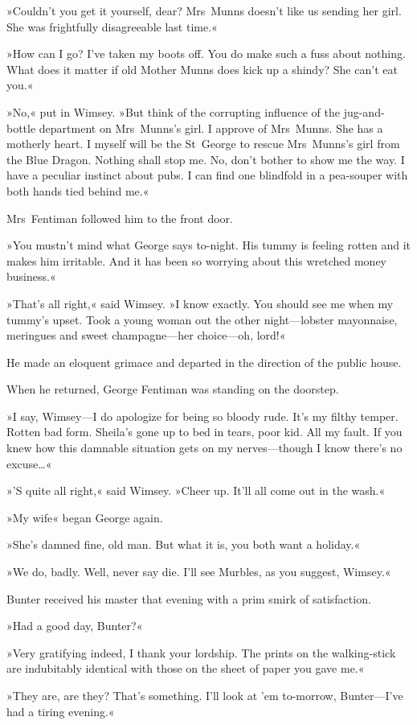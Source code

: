 »Couldn't you get it yourself, dear? Mrs~Munns doesn't like us sending her girl. She was frightfully disagreeable last time.«

»How can I go? I've taken my boots off. You do make such a fuss about nothing. What does it matter if old Mother Munns does kick up a shindy? She can't eat you.«

»No,« put in Wimsey. »But think of the corrupting influence of the jug-and-bottle department on Mrs~Munns's girl. I approve of Mrs~Munns. She has a motherly heart. I myself will be the St~George to rescue Mrs~Munns's girl from the Blue Dragon. Nothing shall stop me. No, don't bother to show me the way. I have a peculiar instinct about pubs. I can find one blindfold in a pea-souper with both hands tied behind me.«

Mrs~Fentiman followed him to the front door.

»You mustn't mind what George says to-night. His tummy is feeling rotten and it makes him irritable. And it has been so worrying about this wretched money business.«

»That's all right,« said Wimsey. »I know exactly. You should see me when my tummy's upset. Took a young woman out the other night—lobster mayonnaise, meringues and sweet champagne—her choice—oh, lord!«

He made an eloquent grimace and departed in the direction of the public house.

When he returned, George Fentiman was standing on the doorstep.

»I say, Wimsey—I do apologize for being so bloody rude. It's my filthy temper. Rotten bad form. Sheila's gone up to bed in tears, poor kid. All my fault. If you knew how this damnable situation gets on my nerves—though I know there's no excuse\dots«

»'S quite all right,« said Wimsey. »Cheer up. It'll all come out in the wash.«

»My wife\longdash« began George again.

»She's damned fine, old man. But what it is, you both want a holiday.«

»We do, badly. Well, never say die. I'll see Murbles, as you suggest, Wimsey.«

Bunter received his master that evening with a prim smirk of satisfaction.

»Had a good day, Bunter?«

»Very gratifying indeed, I thank your lordship. The prints on the walking-stick are indubitably identical with those on the sheet of paper you gave me.«

»They are, are they? That's something. I'll look at 'em to-morrow, Bunter—I've had a tiring evening.«